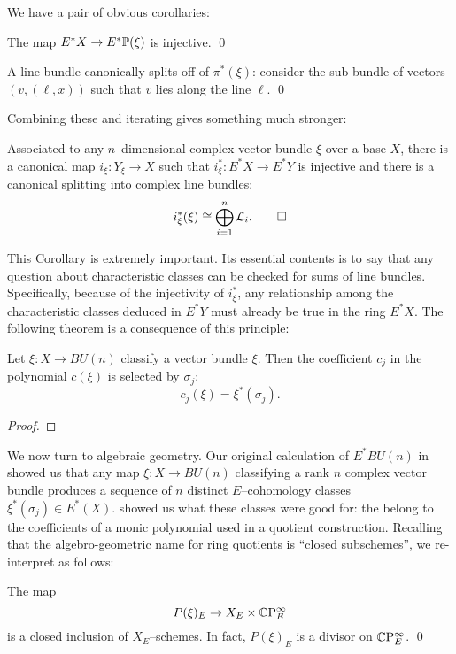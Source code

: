 We have a pair of obvious corollaries:
\begin{corollary}
The map $E^* X \to E^* \P(\xi)$ is injective. \qed
\end{corollary}
\begin{corollary}
A line bundle canonically splits off of $\pi^*(\xi)$: consider the sub-bundle of vectors $(v, (\ell, x))$ such that $v$ lies along the line $\ell$. \qed
\end{corollary}

\noindent Combining these and iterating gives something much stronger:

\begin{corollary}
Associated to any $n$--dimensional complex vector bundle $\xi$ over a base $X$, there is a canonical map $i_\xi: Y_\xi \to X$ such that $i_\xi^*: E^* X \to E^* Y$ is injective and there is a canonical splitting into complex line bundles: \[i_\xi^*(\xi) \cong \bigoplus_{i=1}^n \L_i. \qed\]
\end{corollary}

This Corollary is extremely important.  Its essential contents is to say that any question about characteristic classes can be checked for sums of line bundles.  Specifically, because of the injectivity of $i_\xi^*$, any relationship among the characteristic classes deduced in $E^* Y$ must already be true in the ring $E^* X$.  The following theorem is a consequence of this principle:

\begin{theorem}
Let $\xi: X \to BU(n)$ classify a vector bundle $\xi$.  Then the coefficient $c_j$ in the polynomial $c(\xi)$ is selected by $\sigma_j$: \[c_j(\xi) = \xi^*(\sigma_j).\]
\end{theorem}
\begin{proof}
\end{proof}

We now turn to algebraic geometry.  Our original calculation of $E^* BU(n)$ in  showed us that any map $\xi: X \to BU(n)$ classifying a rank $n$ complex vector bundle produces a sequence of $n$ distinct $E$--cohomology classes $\xi^*(\sigma_j) \in E^*(X)$.   showed us what these classes were good for: the belong to the coefficients of a monic polynomial used in a quotient construction.  Recalling that the algebro-geometric name for ring quotients is ``closed subschemes'', we re-interpret  as follows:
\begin{corollary}
The map \[P(\xi)_E \to X_E \times \CP^\infty_E\] is a closed inclusion of $X_E$--schemes.  In fact, $P(\xi)_E$ is a divisor on $\CP^\infty_E$. \qed
\end{corollary}

